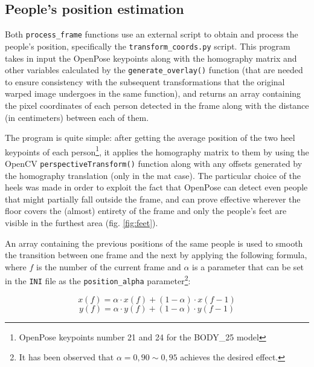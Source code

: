 \documentclass[12pt]{article}
\begin{document}

\subsection{People’s position estimation}
\label{chap:position}

Both \lstinline{process_frame} functions use an external script to obtain and process the people’s position, specifically the \lstinline{transform_coords.py} script. This program takes in input the OpenPose keypoints along with the homography matrix and other variables calculated by the \lstinline{generate_overlay()} function (that are needed to ensure consistency with the subsequent transformations that the original warped image undergoes in the same function), and returns an array containing the pixel coordinates of each person detected in the frame along with the distance (in centimeters) between each of them.

The program is quite simple: after getting the average position of the two heel keypoints of each person\footnote{OpenPose keypoints number 21 and 24 for the BODY\_25 model\cite{opkp}}, it applies the homography matrix to them by using the OpenCV \lstinline{perspectiveTransform()}\cite{cvpertrans} function along with any offsets generated by the homography translation (only in the mat case). The particular choice of the heels was made in order to exploit the fact that OpenPose can detect even people that might partially fall outside the frame, and can prove effective wherever the floor covers the (almost) entirety of the frame and only the people’s feet are visible in the furthest area (fig. \ref{fig:feet}).

An array containing the previous positions of the same people is used to smooth the transition between one frame and the next by applying the following formula, where $f$ is the number of the current frame and $\alpha$ is a parameter that can be set in the \lstinline{INI} file as the \lstinline{position_alpha} parameter\footnote{It has been observed that $\alpha = 0,90 \sim 0,95$ achieves the desired effect.}:

\begin{equation}
x(f) = \alpha \cdot x(f) + (1-\alpha) \cdot x(f-1)
\label{eq:weightx}
\end{equation}
\begin{equation}
y(f) = \alpha \cdot y(f) + (1-\alpha) \cdot y(f-1)
\label{eq:weighty}
\end{equation}
\end{document}
